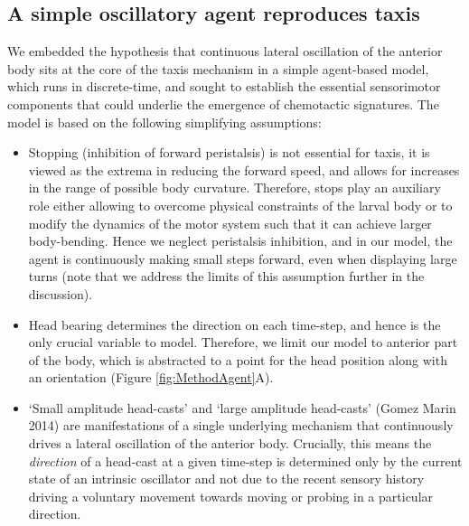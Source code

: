 \documentclass[11pt,a4paper]{article}
\begin{document}
\subsection{A simple oscillatory agent reproduces taxis}
We embedded the hypothesis that continuous lateral oscillation of the anterior body sits at the core of the taxis mechanism in a simple agent-based model, which runs in discrete-time, and sought to establish the essential sensorimotor components that could underlie the emergence of chemotactic signatures. The model is based on the following simplifying assumptions:
\begin{itemize}
\item Stopping (inhibition of forward peristalsis) is not essential for taxis, it is viewed as the extrema in reducing the forward speed, and allows for increases in the range of possible body curvature. Therefore, stops play an auxiliary role either allowing to overcome physical constraints of the larval body or to modify the dynamics of the motor  system such that it can achieve larger body-bending. Hence we neglect peristalsis inhibition, and in our model, the agent is continuously making small steps forward, even when displaying large turns (note that we address the limits of this assumption further in the discussion).
\item Head bearing determines the direction on each time-step, and hence is the only crucial variable to model.
 Therefore, we limit our model to anterior part of the body, which is abstracted to a point for the head position along with an orientation (Figure \ref{fig:MethodAgent}A). 
\item ‘Small amplitude head-casts’ and ‘large amplitude head-casts’ (Gomez Marin 2014) are manifestations of a single underlying mechanism that continuously drives a lateral oscillation of the anterior body.
 Crucially, this means the {\it direction} of a head-cast at a given time-step is determined only by the current state of an intrinsic oscillator and not due to the recent sensory history driving a voluntary movement towards moving or probing in a particular direction.

\end{itemize}
\end{document}
